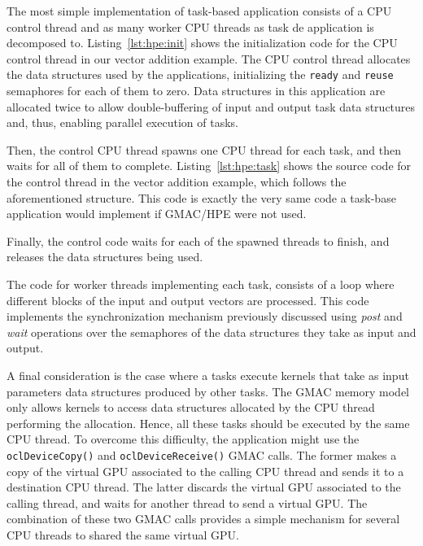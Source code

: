 

The most simple implementation of task\hyp{}based application consists of a CPU control thread and 
as many worker CPU threads as task de application is decomposed to. Listing~\ref{lst:hpe:init} shows 
the initialization code for the CPU control thread in our vector addition example. The CPU control 
thread allocates the data structures used by the applications, initializing the \texttt{ready} and 
\texttt{reuse} semaphores for each of them to zero. Data structures in this application are 
allocated twice to allow double\hyp{}buffering of input and output task data structures and, thus, 
enabling parallel execution of tasks.



Then, the control CPU thread spawns one CPU thread for each task, and then waits for all of them to 
complete. Listing~\ref{lst:hpe:task} shows the source code for the control thread in the vector 
addition example, which follows the aforementioned structure. This code is exactly the very same 
code a task\hyp{}base application would implement if GMAC\slash HPE were not used.


Finally, the control code waits for each of the spawned threads to finish, and releases the data 
structures being used.

The code for worker threads implementing each task, consists of a loop where different blocks of the 
input and output vectors are processed. This code implements the synchronization mechanism 
previously discussed using \emph{post} and \emph{wait} operations over the semaphores of the data 
structures they take as input and output.

A final consideration is the case where a tasks execute kernels that take as input parameters data 
structures produced by other tasks. The GMAC memory model only allows kernels to access data 
structures allocated by the CPU thread performing the allocation. Hence, all these tasks should be 
executed by the same CPU thread. To overcome this difficulty, the application might use the
\texttt{ocl\-Device\-Copy()} and \texttt{ocl\-Device\-Receive()} GMAC calls. The former makes a copy 
of the virtual GPU associated to the calling CPU thread and sends it to a destination CPU thread.  
The latter discards the virtual GPU associated to the calling thread, and waits for another thread 
to send a virtual GPU\@. The combination of these two GMAC calls provides a simple mechanism for 
several CPU threads to shared the same virtual GPU.

